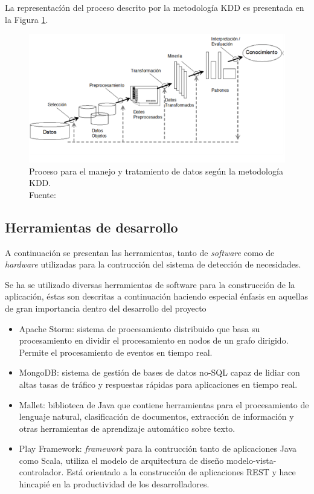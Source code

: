 La representacíón del proceso descrito por la metodología KDD es presentada en la Figura \ref{fig:procesoKDD}.

\begin{figure}[H]
	\centering
	\captionsetup{justification=centering}
	\includegraphics[scale=1]{images/kdd.png}
	\caption[Proceso para el manejo y tratamiento de datos según la metodología KDD.]{Proceso para el manejo y tratamiento de datos según la metodología KDD.\\Fuente: \cite{KDDFigure}}
	\label{fig:procesoKDD}
\end{figure}

\subsection{Herramientas de desarrollo}
\label{subsec:HerrDesarrollo}

A continuación se presentan las herramientas, tanto de \textit{software} como de \textit{hardware} utilizadas para la contrucción del sistema de detección de necesidades.

Se ha se utilizado diversas herramientas de software para la construcción de la aplicación, éstas son descritas a continuación haciendo especial énfasis en aquellas de gran importancia dentro del desarrollo del proyecto

\begin{itemize}
\item Apache Storm: sistema de procesamiento distribuido que basa su procesamiento en dividir el procesamiento en nodos de un grafo dirigido. Permite el procesamiento de eventos en tiempo real.
\item MongoDB: sistema de gestión de bases de datos no-SQL capaz de lidiar con altas tasas de tráfico y respuestas rápidas para aplicaciones en tiempo real.
\item Mallet: biblioteca de Java que contiene herramientas para el procesamiento de lenguaje natural, clasificación de documentos, extracción de información y otras herramientas de aprendizaje automático sobre texto. 
\item Play Framework: \textit{framework} para la contrucción tanto de aplicaciones Java como Scala, utiliza el modelo de arquitectura de diseño modelo-vista-controlador. Está orientado a la construcción de aplicaciones REST y hace hincapié en la productividad de los desarrolladores.
\end{itemize}

